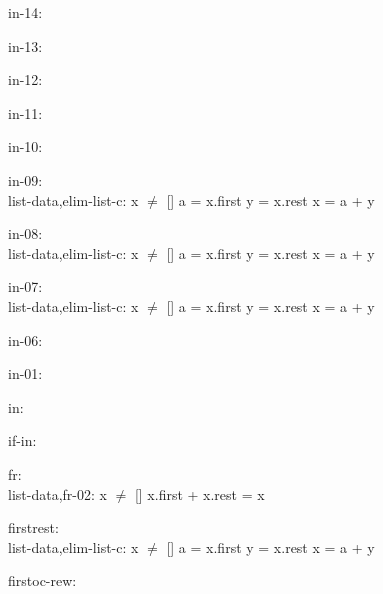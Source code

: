 \documentclass[a4paper]{article}
\begin{document}
in-14:\\ 

\bigskip

in-13:\\ 

\bigskip

in-12:\\ 

\bigskip

in-11:\\ 

\bigskip

in-10:\\ 

\bigskip

in-09:\\ list-data,elim-list-c: 
x $\neq$ []
 \Fol a = x.first \And y = x.rest \Equiv x = a + y



\bigskip

in-08:\\ list-data,elim-list-c: 
x $\neq$ []
 \Fol a = x.first \And y = x.rest \Equiv x = a + y



\bigskip

in-07:\\ list-data,elim-list-c: 
x $\neq$ []
 \Fol a = x.first \And y = x.rest \Equiv x = a + y



\bigskip

in-06:\\ 

\bigskip

in-01:\\ 

\bigskip

in:\\ 

\bigskip

if-in:\\ 

\bigskip

fr:\\ list-data,fr-02: 
 \Fol x $\neq$ [] \Imp x.first + x.rest = x



\bigskip

firstrest:\\ list-data,elim-list-c: 
x $\neq$ []
 \Fol a = x.first \And y = x.rest \Equiv x = a + y



\bigskip

firstoc-rew:\\ 
\end{document}
